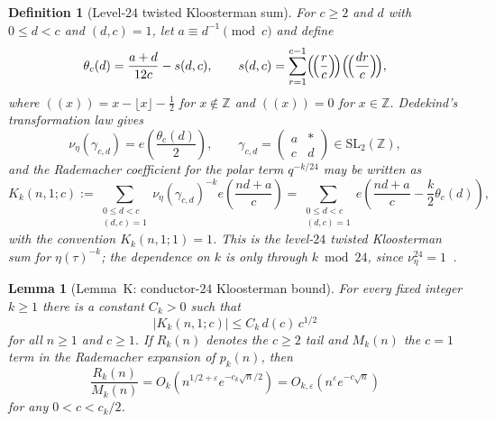 \documentclass[11pt,a4paper]{article}
\newtheorem{lemma}[theorem]{Lemma}
\newtheorem{definition}[theorem]{Definition}
\begin{document}
\begin{definition}[Level-$24$ twisted Kloosterman sum]\label{def:K24}
For $c\ge2$ and $d$ with $0\le d<c$ and $(d,c)=1$, let $a\equiv d^{-1}\pmod c$ and define
\[
  \theta_c(d)=\frac{a+d}{12c}-s(d,c),
  \qquad
  s(d,c)=\sum_{r=1}^{c-1}\Bigl(\!\Bigl(\frac{r}{c}\Bigr)\!\Bigr)\Bigl(\!\Bigl(\frac{dr}{c}\Bigr)\!\Bigr),
\]
where $((x))=x-\lfloor x\rfloor-\tfrac12$ for $x\notin\mathbb Z$ and $((x))=0$ for $x\in\mathbb Z$. Dedekind's transformation law gives
\[
  \nu_{\eta}(\gamma_{c,d})=e\!\left(\frac{\theta_c(d)}{2}\right),
  \qquad
  \gamma_{c,d}=\begin{pmatrix} a & *\\ c & d\end{pmatrix}\in \mathrm{SL}_2(\mathbb Z),
\]
and the Rademacher coefficient for the polar term $q^{-k/24}$ may be written as
\begin{equation}\label{eq:Kk-def}
  K_k(n,1;c)
  := \sum_{\substack{0\le d<c\\ (d,c)=1}}
     \nu_{\eta}(\gamma_{c,d})^{-k} e\!\left(\frac{nd+a}{c}\right)
  = \sum_{\substack{0\le d<c\\ (d,c)=1}}
     e\!\left(\frac{nd+a}{c}-\frac{k}{2}\theta_c(d)\right),
\end{equation}
with the convention $K_k(n,1;1)=1$. This is the level-$24$ twisted Kloosterman sum for $\eta(\tau)^{-k}$; the dependence on $k$ is only through $k\bmod 24$, since $\nu_{\eta}^{24}=1$~\cite{rademacher1937,apostol1990}.
\end{definition}

\begin{lemma}[Lemma~K: conductor-$24$ Kloosterman bound]\label{lem:K}
For every fixed integer $k\ge1$ there is a constant $C_k>0$ such that
\begin{equation}\label{eq:lemmaK-weil}
  |K_k(n,1;c)| \le C_k\,d(c)\,c^{1/2}
\end{equation}
for all $n\ge1$ and $c\ge1$. If $R_k(n)$ denotes the $c\ge2$ tail and $M_k(n)$ the $c=1$ term in the Rademacher expansion of $p_k(n)$, then
\begin{equation}\label{eq:lemmaK-tail}
  \frac{R_k(n)}{M_k(n)}=O_k\!\left(n^{1/2+\varepsilon}e^{-c_k\sqrt n/2}\right)
  = O_{k,\varepsilon}\!\left(n^{\varepsilon}e^{-c\sqrt n}\right)
\end{equation}
for any $0<c<c_k/2$.
\end{lemma}
\end{document}
